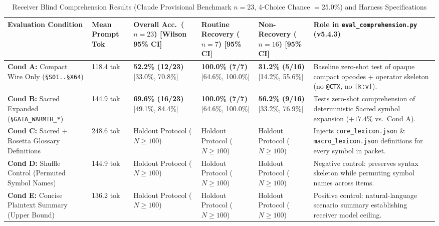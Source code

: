 \documentclass[9pt,a4paper]{extarticle}
\begin{document}
\begin{table}[h!]
\centering
\caption{Receiver Blind Comprehension Results (Claude Provisional Benchmark $n=23$, 4-Choice Chance $= 25.0\%$) and Harness Specifications}
\label{tab:comprehension_results}
\footnotesize
\renewcommand{\arraystretch}{1.08}
\begin{tabularx}{\textwidth}{L{3.5cm} C{1.4cm} C{2.2cm} C{2.2cm} C{2.2cm} Y}
\toprule
{}
\textbf{\color{white}Evaluation Condition} &
\textbf{\color{white}Mean Prompt Tok} &
\textbf{\color{white}Overall Acc.\ ($n=23$) [Wilson 95\% CI]} &
\textbf{\color{white}Routine Recovery ($n=7$) [95\% CI]} &
\textbf{\color{white}Non-Recovery ($n=16$) [95\% CI]} &
\textbf{\color{white}Role in \texttt{eval\_comprehension.py} (v5.4.3)} \\
\midrule
\textbf{Cond A:} Compact Wire Only (\texttt{\S S01..\S X64}) & 118.4 tok & \textbf{52.2\% (12/23)} [33.0\%, 70.8\%] & \textbf{100.0\% (7/7)} [64.6\%, 100.0\%] & \textbf{31.2\% (5/16)} [14.2\%, 55.6\%] & Baseline zero-shot test of opaque compact opcodes + operator skeleton (no \texttt{@CTX}, no \texttt{[k:v]}). \\
\textbf{Cond B:} Sacred Expanded (\texttt{\S GAIA\_WARMTH\_*}) & 144.9 tok & \textbf{69.6\% (16/23)} [49.1\%, 84.4\%] & \textbf{100.0\% (7/7)} [64.6\%, 100.0\%] & \textbf{56.2\% (9/16)} [33.2\%, 76.9\%] & Tests zero-shot comprehension of deterministic Sacred symbol expansion ($+17.4\%$ vs.\ Cond A). \\
\textbf{Cond C:} Sacred + Rosetta Glossary Definitions & 248.6 tok & Holdout Protocol ($N \ge 100$) & Holdout Protocol ($N \ge 100$) & Holdout Protocol ($N \ge 100$) & Injects \texttt{core\_lexicon.json} \& \texttt{macro\_lexicon.json} definitions for every symbol in packet. \\
\textbf{Cond D:} Shuffle Control (Permuted Symbol Names) & 144.9 tok & Holdout Protocol ($N \ge 100$) & Holdout Protocol ($N \ge 100$) & Holdout Protocol ($N \ge 100$) & Negative control: preserves syntax skeleton while permuting symbol names across items. \\
\textbf{Cond E:} Concise Plaintext Summary (Upper Bound) & 136.2 tok & Holdout Protocol ($N \ge 100$) & Holdout Protocol ($N \ge 100$) & Holdout Protocol ($N \ge 100$) & Positive control: natural-language scenario summary establishing receiver model ceiling. \\
\bottomrule
\end{tabularx}
\end{table}
\end{document}
